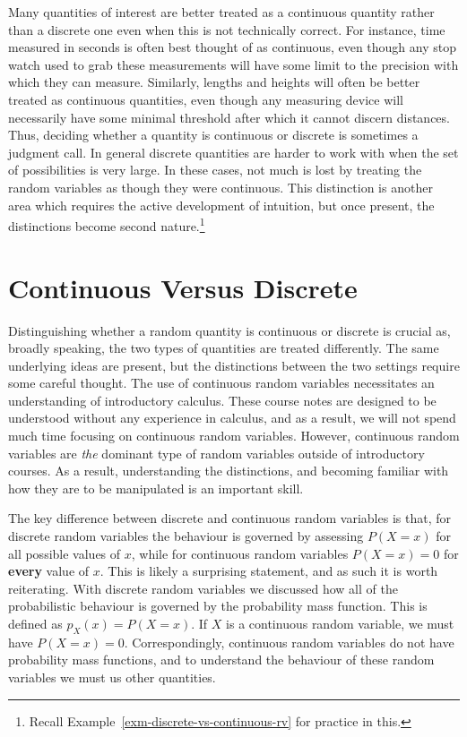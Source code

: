 \documentclass[
  letterpaper,
  DIV=11,
  numbers=noendperiod]{scrreprt}
\theoremstyle{definition}
\theoremstyle{definition}
\theoremstyle{definition}
\theoremstyle{remark}
\begin{document}
Many quantities of interest are better treated as a continuous quantity
rather than a discrete one even when this is not technically correct.
For instance, time measured in seconds is often best thought of as
continuous, even though any stop watch used to grab these measurements
will have some limit to the precision with which they can measure.
Similarly, lengths and heights will often be better treated as
continuous quantities, even though any measuring device will necessarily
have some minimal threshold after which it cannot discern distances.
Thus, deciding whether a quantity is continuous or discrete is sometimes
a judgment call. In general discrete quantities are harder to work with
when the set of possibilities is very large. In these cases, not much is
lost by treating the random variables as though they were continuous.
This distinction is another area which requires the active development
of intuition, but once present, the distinctions become second
nature.\footnote{Recall Example~\ref{exm-discrete-vs-continuous-rv} for
  practice in this.}

\section{Continuous Versus Discrete}\label{continuous-versus-discrete}

Distinguishing whether a random quantity is continuous or discrete is
crucial as, broadly speaking, the two types of quantities are treated
differently. The same underlying ideas are present, but the distinctions
between the two settings require some careful thought. The use of
continuous random variables necessitates an understanding of
introductory calculus. These course notes are designed to be understood
without any experience in calculus, and as a result, we will not spend
much time focusing on continuous random variables. However, continuous
random variables are \emph{the} dominant type of random variables
outside of introductory courses. As a result, understanding the
distinctions, and becoming familiar with how they are to be manipulated
is an important skill.

The key difference between discrete and continuous random variables is
that, for discrete random variables the behaviour is governed by
assessing \(P(X=x)\) for all possible values of \(x\), while for
continuous random variables \(P(X=x)=0\) for \textbf{every} value of
\(x\). This is likely a surprising statement, and as such it is worth
reiterating. With discrete random variables we discussed how all of the
probabilistic behaviour is governed by the probability mass function.
This is defined as \(p_X(x) = P(X=x)\). If \(X\) is a continuous random
variable, we must have \(P(X=x) = 0\). Correspondingly, continuous
random variables do not have probability mass functions, and to
understand the behaviour of these random variables we must us other
quantities.
\end{document}
